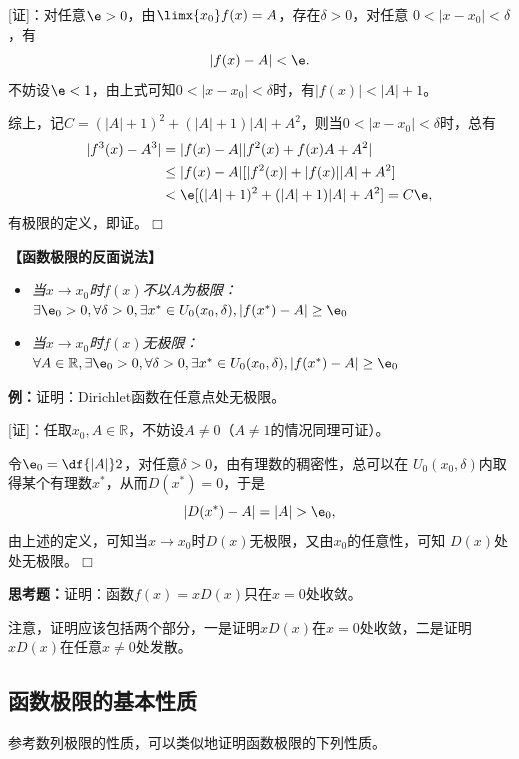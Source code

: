 [证]：对任意$\e>0$，由$\limx{x_0}f(x)=A$，存在$\delta>0$，对任意
$0<|x-x_0|<\delta$，有
$$|f(x)-A|<\e.$$
不妨设$\e<1$，由上式可知$0<|x-x_0|<\delta$时，有$|f(x)|<|A|+1$。

综上，记$C=(|A|+1)^2+(|A|+1)|A|+A^2$，则当$0<|x-x_0|<\delta$时，总有
\begin{align}
	|f^3(x)-A^3|&=|f(x)-A||f^2(x)+f(x)A+A^2|\notag\\
	&\leq |f(x)-A|[|f^2(x)|+|f(x)||A|+A^2]\notag\\
	&<\e[(|A|+1)^2+(|A|+1)|A|+A^2]=C\e\notag,
\end{align}
有极限的定义，即证。\hfill $\Box$

\begin{shaded}
	{\bf 【函数极限的反面说法】}
	\begin{tcolorbox}
		\begin{itemize}
		  \item {\it 当$x\to x_0$时$f(x)$不以$A$为极限：} 
		    $\exists\e_0>0,\forall\delta>0, \exists x^*\in
		    U_0(x_0,\delta),|f(x^*)-A|\geq\e_0$ 
		  \item {\it 当$x\to x_0$时$f(x)$无极限：}
			$\forall A\in\mathbb{R},\exists\e_0>0,\forall\delta>0, \exists x^*\in
		    U_0(x_0,\delta),|f(x^*)-A|\geq\e_0$ 
		\end{itemize}
	\end{tcolorbox}

	{\bf 例：}证明：Dirichlet函数在任意点处无极限。
	
	[证]：任取$x_0,A\in\mathbb{R}$，不妨设$A\ne 0$（$A\ne 1$的情况同理可证）。
	
	令$\e_0=\df{|A|}2$，对任意$\delta>0$，由有理数的稠密性，总可以在
	$U_0(x_0,\delta)$内取得某个有理数$x^*$，从而$D(x^*)=0$，于是
	$$|D(x^*)-A|=|A|>\e_0,$$
	由上述的定义，可知当$x\to x_0$时$D(x)$无极限，又由$x_0$的任意性，可知
	$D(x)$处处无极限。\hfill $\Box$
	
	{\bf 思考题：}证明：函数$f(x)=xD(x)$只在$x=0$处收敛。

	注意，证明应该包括两个部分，一是证明$xD(x)$在$x=0$处收敛，二是证明
	$xD(x)$在任意$x\ne 0$处发散。
\end{shaded}

\subsection{函数极限的基本性质}

参考数列极限的性质，可以类似地证明函数极限的下列性质。

